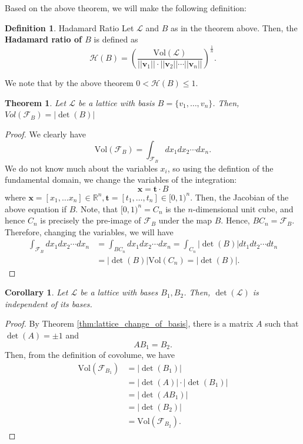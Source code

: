 \documentclass{article}
\newtheorem{theorem}{Theorem}[section]
\newtheorem{corollary}{Corollary}[theorem]
\theoremstyle{definition}
\newtheorem{definition}{Definition}[section]
\theoremstyle{example}
\newcommand{\Vol}{\text{Vol}}
\renewcommand{\L}{\mathcal{L}}
\newcommand{\F}{\mathcal{F}}
\newcommand{\Reals}{\mathbb{R}}
\renewcommand{\H}{\mathcal{H}}
\renewcommand{\vec}[1]{\mathbf{#1}}
\newcommand{\norm}[1]{||#1||}
\begin{document}
Based on the above theorem, we will make the following definition:
\begin{definition}{Hadamard Ratio}
  Let $\L$ and $B$ as in the theorem above. Then, the \textbf{Hadamard ratio of $B$}
  is defined as
  \[
    \H(B) = \left( \frac{\Vol(\L)}{\norm{\vec{v}_1}\cdot\norm{\vec{v}_2}\cdots\norm{\vec{v}_n}} \right)^{\frac1n}.
  \]
\end{definition}
We note that by the above theorem $0 < \H(B) \leq 1$.
\begin{theorem}
  Let $\L$ be a lattice with basis $B = \{v_1, \hdots, v_n\}$. Then, $Vol(\F_B) = |\det(B)|$
\end{theorem}
\begin{proof}
  We clearly have
  \[
    \Vol(\F_B) = \int_{\F_B} dx_1dx_2\cdots dx_n.
  \]
  We do not know much about the variables $x_i$, so using the defintion of the
  fundamental domain, we change the variables of the integration:
  \[
    \vec{x} = \vec{t} \cdot B
  \]
  where $\vec{x} = [x_1, \hdots x_n] \in \Reals^n, \vec{t} = [t_1, \hdots, t_n] \in
  [0, 1)^n$. Then, the Jacobian of the above equation if $B$.
  Note, that $[0, 1)^n = C_n$ is the $n$-dimensional unit cube, and
  hence $C_n$ is precisely the pre-image of $\F_B$ under the map $B$. Hence, $BC_n = \F_B$.
  Therefore, changing the variables, we will have
  \begin{align*}
    \int_{\F_B} dx_1dx_2\cdots dx_n &= \int_{BC_n} dx_1dx_2\cdots dx_n =
                                      \int_{C_n} |\det(B)|dt_1dt_2\cdots dt_n \\
                                    &= |\det(B)|\Vol(C_n) = |\det(B)|.
  \end{align*}
\end{proof}
\begin{corollary}
  Let $\L$ be a lattice with bases $B_1, B_2$. Then, $\det(\L)$ is independent
  of its bases.
\end{corollary}
\begin{proof}
  By Theorem \ref{thm:lattice_change_of_basis}, there is a matrix $A$ such that
  $\det(A) = \pm 1$ and
  \[
    AB_1 = B_2.
  \]
  Then, from the definition of covolume, we have
  \begin{align*}
    \Vol(\F_{B_1}) &= |\det(B_1)| \\
                  &= |\det(A)| \cdot |\det(B_1)| \\
                  &= |\det(AB_1) | \\
                  &= |\det(B_2)| \\
                  &= \Vol(\F_{B_2}).
  \end{align*}
\end{proof}
\end{document}
